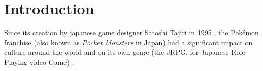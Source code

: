 \documentclass[11pt]{article}
\begin{document}
%
%
%	
%	
%	
%	


%
%


\newpage
\section{Introduction}

Since its creation by japanese game designer  Satoshi Tajiri in 1995 \cite{PkmnCreator,SatoshiBook}, the Pokémon franchise (also known as \textit{Pocket Monsters} in Japan) had a significant impact on culture around the world \cite{PkmnPop,PkmnEffect} and on its own genre (the JRPG, for Japanese Role-Playing video Game) \cite{PkmnRPG}.
\end{document}
